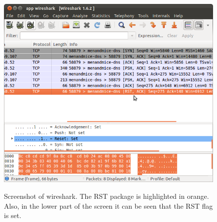 \begin{center}
\begin{figure}[h]
	\centering
	\mbox{\includegraphics[width=1.2\textwidth]{Images/tcp_rst.png}}
	\label{fig:TCP_RST}
	\caption{Screenshot of wireshark. The RST package is highlighted in orange. Also, in the lower part of the screen it can be seen that the RST flag is set.}
\end{figure}
\end{center}

